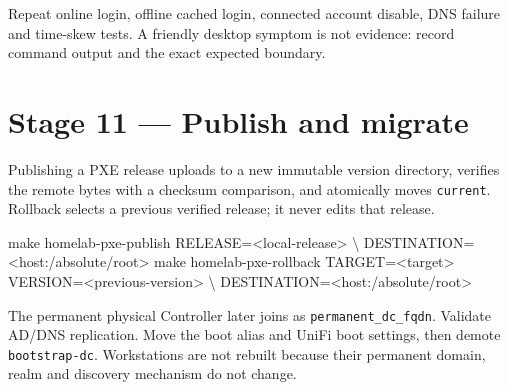 
Repeat online login, offline cached login, connected account disable, DNS
failure and time-skew tests. A friendly desktop symptom is not evidence:
record command output and the exact expected boundary.





\section{Stage 11 --- Publish and migrate}

Publishing a PXE release uploads to a new immutable version directory, verifies
the remote bytes with a checksum comparison, and atomically moves
\texttt{current}. Rollback selects a previous verified release; it never edits
that release.

\begin{shellblock}
make homelab-pxe-publish RELEASE=<local-release> \textbackslash
  DESTINATION=<host:/absolute/root>
make homelab-pxe-rollback TARGET=<target> VERSION=<previous-version> \textbackslash
  DESTINATION=<host:/absolute/root>
\end{shellblock}

The permanent physical Controller later joins as \texttt{permanent\_dc\_fqdn}.
Validate AD/DNS replication. Move the boot alias and UniFi boot settings, then
demote \texttt{bootstrap-dc}. Workstations are not rebuilt because their
permanent domain, realm and discovery mechanism do not change.

\begin{telosfacts}[0.27]
\end{telosfacts}

